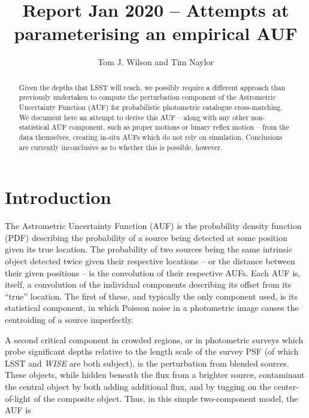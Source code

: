 \documentclass[fleqn,usenatbib]{mnras}
\title[]{Report Jan 2020 – Attempts at parameterising an empirical AUF}
\author[Tom J. Wilson and Tim Naylor]{
Tom J. Wilson
and Tim Naylor
\\
}
\date{}
\begin{document}
\label{firstpage}
\pagerange{\pageref{firstpage}--\pageref{lastpage}}
\maketitle
\begin{abstract}

Given the depths that LSST will reach, we possibly require a different approach than previously undertaken to compute the perturbation component of the Astrometric Uncertainty Function (AUF) for probabilistic photometric catalogue cross-matching. We document here an attempt to derive this AUF -- along with any other non-statistical AUF component, such as proper motions or binary reflex motion -- from the data themselves, creating in-situ AUFs which do not rely on simulation. Conclusions are currently inconclusive as to whether this is possible, however.

\end{abstract}



\section{Introduction}

The Astrometric Uncertainty Function (AUF) is the probability density function (PDF) describing the probability of a source being detected at some position given its true location. The probability of two sources being the same intrinsic object detected twice given their respective locations -- or the distance between their given positions -- is the convolution of their respective AUFs. Each AUF is, itself, a convolution of the individual components describing its offset from its ``true'' location. The first of these, and typically the only component used, is its statistical component, in which Poisson noise in a photometric image causes the centroiding of a source imperfectly.

A second critical component in crowded regions, or in photometric surveys which probe significant depths relative to the length scale of the survey PSF (of which LSST and \textit{WISE} are both subject), is the perturbation from blended sources. These objects, while hidden beneath the flux from a brighter source, contaminant the central object by both adding additional flux, and by tugging on the center-of-light of the composite object. Thus, in this simple two-component model, the AUF is
\end{document}
